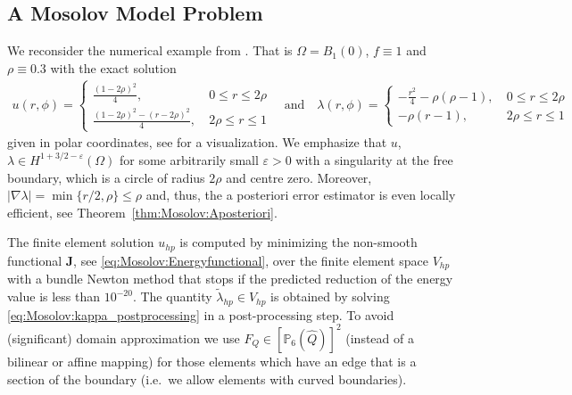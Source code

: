 \documentclass[12pt,twoside,reqno]{amsart}
\theoremstyle{definition}
\numberwithin{equation}{section}
\begin{document}

\subsection{A Mosolov Model Problem} \label{sec:Num:Mosolov}
We reconsider the numerical example from \cite{Banz2022}. That is $\Omega =B_1(0)$, $f \equiv 1$ and $\rho \equiv 0.3$ with the exact solution
\begin{align*}
 u(r,\phi)= \begin{cases}
             \frac{(1-2\rho)^2}{4},  \  & 0 \leq r \leq 2\rho\\
             \frac{(1-2\rho)^2-(r-2\rho)^2}{4},  \  & 2\rho \leq r \leq 1
            \end{cases} \quad \text{and} \quad 
 \lambda(r,\phi) = \begin{cases}
             -\frac{r^2}{4} - \rho(\rho-1),  \  & 0 \leq r \leq 2\rho\\
             -\rho(r-1),  \  & 2\rho \leq r \leq 1
            \end{cases}            
\end{align*}
given in polar coordinates, see \cite[Fig.~1]{Banz2022} for a visualization. We emphasize that $u$, $\lambda \in H^{1+3/2 - \varepsilon}(\Omega)$ for some arbitrarily small $\varepsilon>0$ with a singularity at the free boundary, which is a circle of radius $2\rho$ and centre zero. Moreover, $|\nabla \lambda| = \min\{r/2,\rho\} \leq \rho$ and, thus, the a posteriori error estimator is even locally efficient, see Theorem~\ref{thm:Mosolov:Aposteriori}.
            
The finite element solution $u_{hp}$ is computed by minimizing the non-smooth functional $\bm{J}$, see \eqref{eq:Mosolov:Energyfunctional}, over the finite element space $V_{hp}$ with a bundle Newton method that stops if the predicted reduction of the energy value is less than $10^{-20}$. The quantity $\tilde{\lambda}_{hp} \in V_{hp}$ is obtained by solving \eqref{eq:Mosolov:kappa_postprocessing} in a post-processing step.
To avoid (significant) domain approximation we use $F_Q \in [\mathbb{P}_6(\widehat{Q})]^2$  (instead of a bilinear or affine mapping) for those elements which have an edge that is a section of the boundary (i.e.~we allow elements with curved boundaries). 
\end{document}
